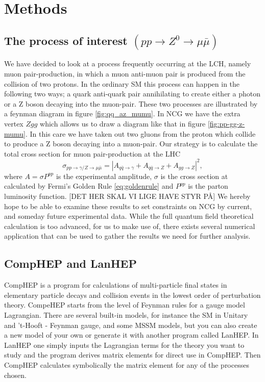 \section{Methods}

\subsection{The process of interest $(pp \rightarrow Z^0 \rightarrow \mu \bar\mu)$}
We have decided to look at a process frequently occurring at the LCH, namely muon pair-production, in which a muon anti-muon pair is produced from the collision of two protons. In the ordinary SM this process can happen in the following two ways; a quark anti-quark pair annihilating to create either a photon or a Z boson decaying into the muon-pair. These two processes are illustrated by a feynman diagram in figure \ref{fig:qq_az_mumu}. In NCG we have the extra vertex $Zgg$ which allows us to draw a diagram like that in figure \ref{fig:pp-gg-z-mumu}. In this care we have taken out two gluons from the proton which collide to produce a Z boson decaying into a muon-pair. Our strategy is to calculate the total cross section for muon pair-production at the LHC
\begin{equation}
	\sigma_{pp \rightarrow \gamma/ Z \rightarrow \mu \bar \mu} = |A_{q \bar q \rightarrow \gamma} + A_{q \bar q \rightarrow Z} + A_{gg \rightarrow Z}|^{2},
\end{equation}
where $A = \sigma P^{pp}$ is the experimental amplitude, $\sigma$ is the cross section at calculated by Fermi's Golden Rule \eqref{eq:goldenrule} and $P^{pp}$ is the parton luminosity function. [DET HER SKAL VI LIGE HAVE STYR PÅ] We hereby hope to be able to examine these results to set constraints on NCG by current, and someday future experimental data. While the full quantum field theoretical calculation is too advanced, for us to make use of, there exists several numerical application that can be used to gather the results we need for further analysis.

\begin{figure}[htp]
\centering
	
\caption{} \label{fig:feyn:pp-gg-z-mumu}
\end{figure}

\subsection{CompHEP and LanHEP}

CompHEP is a program for calculations of multi-particle final states in elementary particle decays and collision events in the lowest order of perturbation theory. CompeHEP starts from the level of Feynman rules for a gauge model Lagrangian. There are several built-in models, for instance the SM in Unitary and 't-Hooft - Feynman gauge, and some MSSM models, but you can also create a new model of your own or generate it with another program called LanHEP. In LanHEP one simply inputs the Lagrangian terms for the theory you want to study and the program derives matrix elements for direct use in CompHEP.  Then CompHEP calculates symbolically the matrix element for any of the processes chosen.


